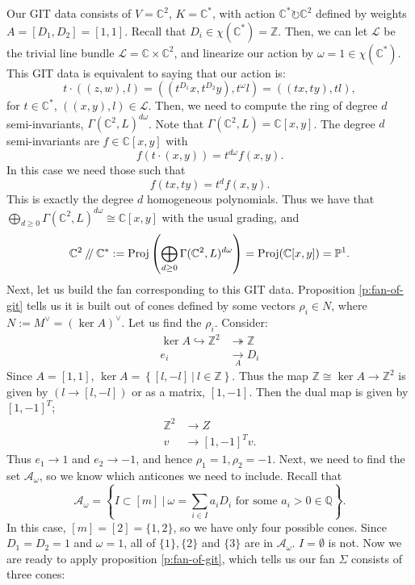 \documentclass{article}
\theoremstyle{definition}
\theoremstyle{remark}
\numberwithin{theorem}{section}
\newcommand{\C}{\mathbb{C}}
\newcommand{\Z}{\mathbb{Z}}
\newcommand{\bP}{\mathbb{P}}
\newcommand{\sslash}{\mathbin{/\mkern-4mu/}}
\newcommand{\Proj}{\text{Proj}}
\newcommand{\cL}{\mathcal{L}}
\begin{document}
	Our GIT data consists of $V=\C^2$, $K=\C^\ast$, with action $\C^\ast \circlearrowright \C^2$ defined by weights $A=[D_1,D_2]=[1,1]$. Recall that $D_i \in \chi(\C^\ast)=\Z$. Then, we can let $\cL$ be the trivial line bundle $\cL = \C\times \C^2$, and linearize our action by $\omega = 1 \in \chi(\C^\ast)$. This GIT data is equivalent to saying that our action is:
	$$t \cdot \left((z,w), l\right) = \left((t^{D_1}x, t^{D_2}y), t^\omega l\right) = \left((tx, ty), tl\right),$$
	for $t\in \C^\ast$, $\left((x,y),l\right)\in\cL$. Then, we need to compute the ring of degree $d$ semi-invariants, $\Gamma(\C^2,L)^{d\omega}$. Note that $\Gamma(\C^2, L) = \C[x,y]$. The degree $d$ semi-invariants are $f\in \C[x,y]$ with
	$$ f(t\cdot (x,y)) = t^{d\omega} f(x,y).$$
	In this case we need those such that 
	$$f(tx,ty)=t^d f(x,y).$$
	This is exactly the degree $d$ homogeneous polynomials. Thus we have that $\bigoplus_{d\geq 0}\Gamma(\C^2, L)^{d\omega} \cong \C[x,y]$ with the usual grading, and 
	\begin{equation}
		\C^2\sslash \C^\ast := \Proj\left(\bigoplus_{d\geq 0}\Gamma(\C^2, L)^{d\omega}\right) = \Proj(\C[x,y]) = \bP^1.
	\end{equation}
	Next, let us build the fan corresponding to this GIT data. Proposition \ref{p:fan-of-git} tells us it is built out of cones defined by some vectors $\rho_i \in N$, where $N:=M^\vee = (\ker A)^\vee$. Let us find the $\rho_i$. Consider:
	\begin{align*}
		\ker A \hookrightarrow \Z^2 &\twoheadrightarrow \Z\\
		e_i & \xrightarrow[A]{} D_i
	\end{align*}
	Since $A=[1,1]$, $\ker A=\left\{[l,-l] ~|~ l\in \Z\right\}$. Thus the map $\Z\cong \ker A\to \Z^2$ is given by $(l\to [l,-l])$ or as a matrix, $[1,-1]$. Then the dual map is given by $[1,-1]^T$;
	\begin{align*}
		\Z^2 &\to Z\\
		v&\to [1,-1]^T v.
	\end{align*}
	Thus $e_1\to 1$ and $e_2\to -1$, and hence $\rho_1=1, \rho_2=-1$. Next, we need to find the set $\mathcal{A}_\omega$, so we know which anticones we need to include. Recall that 
	$$\mathcal{A}_\omega = \left\{I\subset [m] ~|~ \omega = \sum_{i\in I} a_i D_i \text{ for some }a_i>0\in \mathbb{Q}\right\}.$$
	In this case, $[m]=[2]=\{1,2\}$, so we have only four possible cones. Since $D_1=D_2=1$ and $\omega =1$, all of $\{1\}, \{2\}$ and $\{3\}$ are in $\mathcal{A}_\omega$. $I=\emptyset$ is not. Now we are ready to apply proposition \ref{p:fan-of-git}, which tells us our fan $\Sigma$ consists of three cones:
\end{document}
